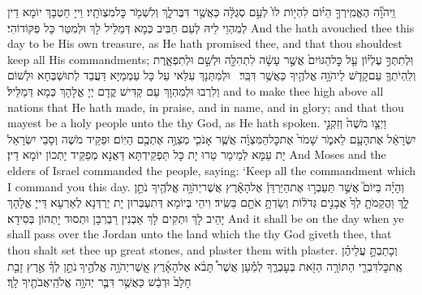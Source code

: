 {וַֽיהֹוָ֞ה הֶאֱמִֽירְךָ֣ הַיּ֗וֹם לִהְי֥וֹת לוֹ֙ לְעַ֣ם סְגֻלָּ֔ה כַּאֲשֶׁ֖ר דִּבֶּר\maqqaf לָ֑ךְ וְלִשְׁמֹ֖ר כׇּל\maqqaf מִצְוֺתָֽיו׃}
{וַייָ חַטְבָךְ יוֹמָא דֵין לְמִהְוֵי לֵיהּ לְעַם חַבִּיב כְּמָא דְּמַלֵּיל לָךְ וּלְמִטַּר כָּל פִּקּוֹדוֹהִי׃}
{And the \lord\space hath avouched thee this day to be His own treasure, as He hath promised thee, and that thou shouldest keep all His commandments;}{}
{וּֽלְתִתְּךָ֣ עֶלְי֗וֹן עַ֤ל כׇּל\maqqaf הַגּוֹיִם֙ אֲשֶׁ֣ר עָשָׂ֔ה לִתְהִלָּ֖ה וּלְשֵׁ֣ם וּלְתִפְאָ֑רֶת וְלִֽהְיֹתְךָ֧ עַם\maqqaf קָדֹ֛שׁ לַיהֹוָ֥ה אֱלֹהֶ֖יךָ כַּאֲשֶׁ֥ר דִּבֵּֽר׃ \petucha }
{וּלְמִתְּנָךְ עִלַּאי עַל כָּל עַמְמַיָּא דַּעֲבַד לְתוּשְׁבְּחָא וּלְשׁוֹם וְלִרְבוּ וּלְמִהְוָךְ עַם קַדִּישׁ קֳדָם יְיָ אֱלָהָךְ כְּמָא דְּמַלֵּיל׃}
{and to make thee high above all nations that He hath made, in praise, and in name, and in glory; and that thou mayest be a holy people unto the \lord\space thy God, as He hath spoken.}{}
\newperek
{}%
{וַיְצַ֤ו מֹשֶׁה֙ וְזִקְנֵ֣י יִשְׂרָאֵ֔ל אֶת\maqqaf הָעָ֖ם לֵאמֹ֑ר שָׁמֹר֙ אֶת\maqqaf כׇּל\maqqaf הַמִּצְוָ֔ה אֲשֶׁ֧ר אָנֹכִ֛י מְצַוֶּ֥ה אֶתְכֶ֖ם הַיּֽוֹם׃}
{וּפַקֵּיד מֹשֶׁה וְסָבֵי יִשְׂרָאֵל יָת עַמָּא לְמֵימַר טַרוּ יָת כָּל תַּפְקֵידְתָּא דַּאֲנָא מְפַקֵּיד יָתְכוֹן יוֹמָא דֵין׃}
{And Moses and the elders of Israel commanded the people, saying: ‘Keep all the commandment which I command you this day.}{}
{וְהָיָ֗ה בַּיּוֹם֮ אֲשֶׁ֣ר תַּעַבְר֣וּ אֶת\maqqaf הַיַּרְדֵּן֒ אֶל\maqqaf הָאָ֕רֶץ אֲשֶׁר\maqqaf יְהֹוָ֥ה אֱלֹהֶ֖יךָ נֹתֵ֣ן לָ֑ךְ וַהֲקֵמֹתָ֤ לְךָ֙ אֲבָנִ֣ים גְּדֹל֔וֹת וְשַׂדְתָּ֥ אֹתָ֖ם בַּשִּֽׂיד׃}
{וִיהֵי בְּיוֹמָא דְּתִעְבְּרוּן יָת יַרְדְּנָא לְאַרְעָא דַּייָ אֱלָהָךְ יָהֵיב לָךְ וּתְקִים לָךְ אַבְנִין רַבְרְבָן וּתְסוּד יָתְהוֹן בְּסִידָא׃}
{And it shall be on the day when ye shall pass over the Jordan unto the land which the \lord\space thy God giveth thee, that thou shalt set thee up great stones, and plaster them with plaster.}{}
{וְכָתַבְתָּ֣ עֲלֵיהֶ֗ן אֶֽת\maqqaf כׇּל\maqqaf דִּבְרֵ֛י הַתּוֹרָ֥ה הַזֹּ֖את בְּעׇבְרֶ֑ךָ לְמַ֡עַן אֲשֶׁר֩ תָּבֹ֨א אֶל\maqqaf הָאָ֜רֶץ אֲֽשֶׁר\maqqaf יְהֹוָ֥ה אֱלֹהֶ֣יךָ \legarmeh  נֹתֵ֣ן לְךָ֗ אֶ֣רֶץ זָבַ֤ת חָלָב֙ וּדְבַ֔שׁ כַּאֲשֶׁ֥ר דִּבֶּ֛ר יְהֹוָ֥ה אֱלֹהֵֽי\maqqaf אֲבֹתֶ֖יךָ לָֽךְ׃}
